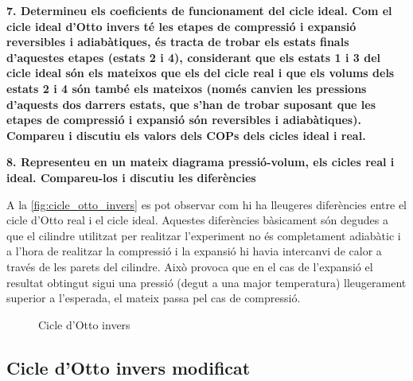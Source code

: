 \documentclass[a4paper]{article}
\begin{document}
\textbf{7. Determineu els coeficients de funcionament del cicle ideal. Com el cicle ideal d’Otto invers té les etapes de compressió i expansió reversibles i adiabàtiques, és tracta de trobar els estats finals d’aquestes etapes (estats 2 i 4), considerant que els estats 1 i 3 del cicle ideal són els mateixos que els del cicle real i que els volums dels estats 2 i 4 són també els mateixos (només canvien les pressions d’aquests dos darrers estats, que s’han de trobar suposant que les etapes de compressió i expansió són reversibles i adiabàtiques). Compareu i discutiu els valors dels COPs dels cicles ideal i real.}

\textbf{8. Representeu en un mateix diagrama pressió-volum, els cicles real i ideal. Compareu-los i discutiu les diferències}

A la \autoref{fig:cicle_otto_invers} es pot observar com hi ha lleugeres diferències entre el cicle d'Otto real i el cicle ideal. Aquestes diferències bàsicament són degudes a que el cilindre utilitzat per realitzar l'experiment no és completament adiabàtic i a l'hora de realitzar la compressió i la expansió hi havia intercanvi de calor a través de les parets del cilindre. Això provoca que en el cas de l'expansió el resultat obtingut sigui una pressió (degut a una major temperatura) lleugerament superior a l'esperada, el mateix passa pel cas de compressió.

\begin{figure}[H]
    \centering
    \caption{Cicle d'Otto invers}
    \label{fig:cicle_otto_invers}
\end{figure}

\subsection*{Cicle d'Otto invers modificat}
\end{document}
